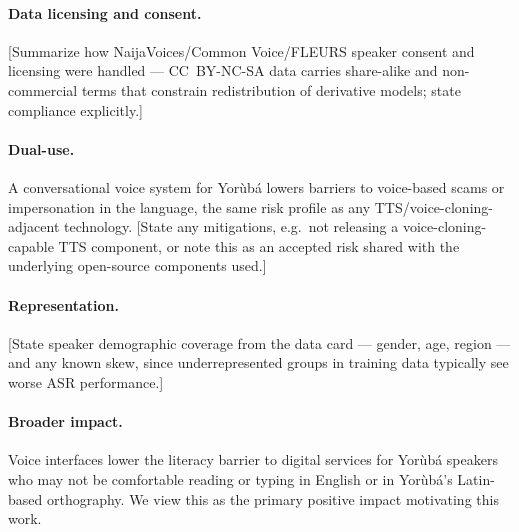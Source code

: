 \paragraph{Data licensing and consent.} [Summarize how NaijaVoices/Common
Voice/FLEURS speaker consent and licensing were handled — CC~BY-NC-SA data
carries share-alike and non-commercial terms that constrain redistribution
of derivative models; state compliance explicitly.]

\paragraph{Dual-use.} A conversational voice system for Yor\`ub\'a lowers
barriers to voice-based scams or impersonation in the language, the same
risk profile as any TTS/voice-cloning-adjacent technology. [State any
mitigations, e.g.\ not releasing a voice-cloning-capable TTS component, or
note this as an accepted risk shared with the underlying open-source
components used.]

\paragraph{Representation.} [State speaker demographic coverage from the
data card — gender, age, region — and any known skew, since underrepresented
groups in training data typically see worse ASR performance.]

\paragraph{Broader impact.} Voice interfaces lower the literacy barrier to
digital services for Yor\`ub\'a speakers who may not be comfortable reading
or typing in English or in Yor\`ub\'a's Latin-based orthography. We view
this as the primary positive impact motivating this work.
